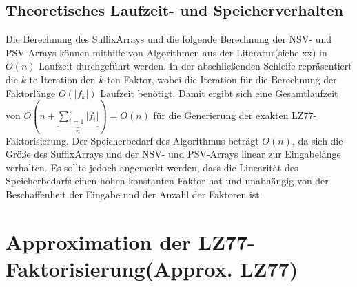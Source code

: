 \subsection{Theoretisches Laufzeit- und Speicherverhalten}
Die Berechnung des SuffixArrays und die folgende Berechnung der NSV- und PSV-Arrays können mithilfe von Algorithmen aus der Literatur(siehe xx) in $O(n)$ Laufzeit 
durchgeführt werden. In der abschließenden Schleife repräsentiert die $k$-te Iteration den $k$-ten Faktor, wobei die Iteration für die Berechnung der Faktorlänge
$O(|f_k|)$ Laufzeit benötigt. Damit ergibt sich eine Gesamtlaufzeit von $O(n +\underbrace{\sum_{i=1}^{z} |f_i|}_{n}) = O(n)$ für die Generierung der exakten LZ77-Faktorisierung.
Der Speicherbedarf des Algorithmus beträgt $O(n)$, da sich die Größe des SuffixArrays und der NSV- und PSV-Arrays linear zur Eingabelänge verhalten. Es sollte jedoch
angemerkt werden, dass die Linearität des Speicherbedarfs einen hohen konstanten Faktor hat und unabhängig von der Beschaffenheit der Eingabe und der Anzahl der Faktoren ist.

\section{Approximation der LZ77-Faktorisierung(Approx. LZ77)}
